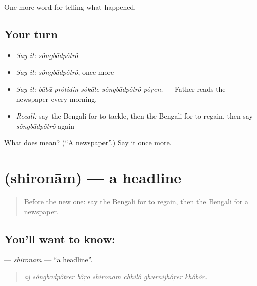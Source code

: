 \begin{grammarlens}[title={What you've built}]
One more word for telling what happened.
\end{grammarlens}

\subsection*{Your turn}
\begin{itemize}
\raggedright
  \item \emph{Say it:} \emph{sôngbādpôtrô}
  \item \emph{Say it:} \emph{sôngbādpôtrô}, once more
  \item \emph{Say it:} \emph{bābā prôtidin sôkāle sôngbādpôtrô pôṛen.} — Father reads the newspaper every morning.
  \item \emph{Recall:} say the Bengali for to tackle, then the Bengali for to regain, then say \emph{sôngbādpôtrô} again
\end{itemize}

\begin{tcolorbox}[breakable,colback=teal!4,colframe=teal!35!black,title={Before you move on}]
What does  mean? (\textquotedblleft{}A newspaper\textquotedblright{}.) Say it once more.
\end{tcolorbox}
\section[\texorpdfstring{\bn{শিরোনাম} (shironām)}{শিরোনাম (shironām)}]{ (shironām) — a headline}

\label{lesson:BN-C296-shironam}



\begin{quote}
Before the new one: say the Bengali for to regain, then the Bengali for a newspaper.
\end{quote}

\subsection*{You'll want to know: }
\textbf{} — \emph{shironām} — \textquotedblleft{}a headline\textquotedblright{}.

\begin{quote}
      
\end{quote}

\begin{quote}
\emph{āj sôngbādpôtrer bôṛo shironām chhilô ghūrnijhôṛer khôbôr.}
\end{quote}


